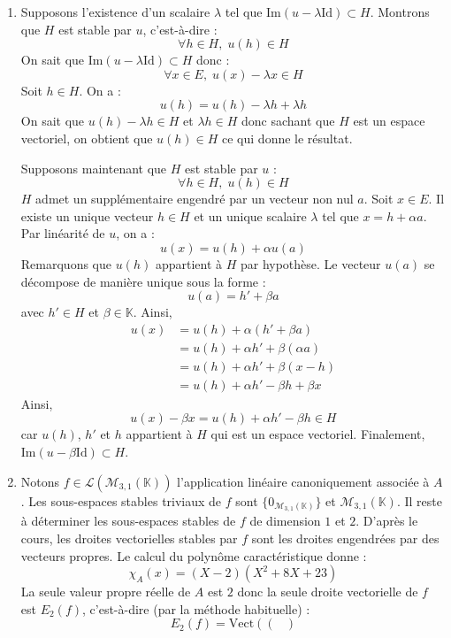 \documentclass[a4paper,10pt]{report}
\begin{document}
\corr \begin{enumerate}
\item Supposons l'existence d'un scalaire $\lambda$ tel que $\textrm{Im}(u- \lambda \textrm{Id}) \subset H$. Montrons que $H$ est stable par $u$, c'est-à-dire :
$$ \forall h \in H, \; u(h) \in H$$
On sait que $\textrm{Im}(u- \lambda \textrm{Id}) \subset H$ donc :
$$ \forall x \in E, \; u(x)- \lambda x \in H$$
Soit $h \in H$. On a :
$$ u(h) = u(h)- \lambda h + \lambda h$$
On sait que $u(h) - \lambda h \in H$ et $\lambda h \in H$ donc sachant que $H$ est un espace vectoriel, on obtient que $u(h) \in H$ ce qui donne le résultat.

\medskip

\noindent Supposons maintenant que $H$ est stable par $u$ :
$$ \forall h \in H, \; u(h) \in H$$
$H$ admet un supplémentaire engendré par un vecteur non nul $a$. Soit $x \in E$. Il existe un unique vecteur $h \in H$ et un unique scalaire $\lambda$ tel que $x=h + \alpha a$. Par linéarité de $u$, on a :
$$ u(x) = u(h) + \alpha u(a)$$
Remarquons que $u(h)$ appartient à $H$ par hypothèse. Le vecteur $u(a)$ se décompose de manière unique sous la forme :
$$ u(a) = h' + \beta  a$$
avec $h' \in H$ et $\beta \in \mathbb{K}$. Ainsi,
\begin{align*}
u(x) & = u(h)+ \alpha (h'+ \beta a) \\
& = u(h) + \alpha h' + \beta (\alpha a) \\
& = u(h) + \alpha h' + \beta(x-h) \\
& = u(h)+ \alpha h' - \beta h + \beta x
\end{align*}
Ainsi,
$$ u(x)- \beta x = u(h)+ \alpha h' - \beta h \in H$$
car $u(h)$, $h'$ et $h$ appartient à $H$ qui est un espace vectoriel. Finalement, $\textrm{Im}(u- \beta \textrm{Id}) \subset H$.
\item Notons $f \in \mathcal{L}(\mathcal{M}_{3,1}(\mathbb{K}))$ l'application linéaire canoniquement associée à $A$. Les sous-espaces stables triviaux de $f$ sont $\lbrace 0_{\mathcal{M}_{3,1}(\mathbb{K})} \rbrace$ et $\mathcal{M}_{3,1}(\mathbb{K})$. Il reste à déterminer les sous-espaces stables de $f$ de dimension $1$ et $2$. D'après le cours, les droites vectorielles stables par $f$ sont les droites engendrées par des vecteurs propres. Le calcul du polynôme caractéristique donne :
$$ \chi_A(x) = (X-2)(X^2+8X+23)$$
La seule valeur propre réelle de $A$ est $2$ donc la seule droite vectorielle de $f$ est $E_2(f)$, c'est-à-dire (par la méthode habituelle) :
$$ E_2(f) = \textrm{Vect} \left( \begin{pmatrix}

\end{pmatrix}$$
\end{enumerate}
\end{document}
